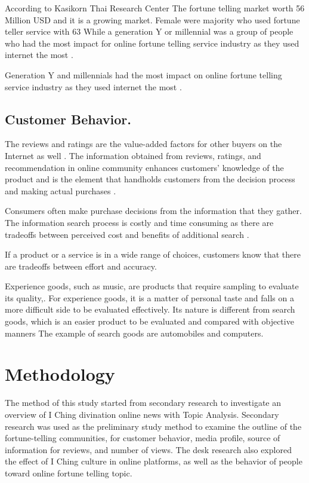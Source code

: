 \documentclass[conference]{IEEEtran}
\begin{document}
According to Kasikorn Thai Research Center \cite{10}The
fortune telling market worth 56 Million USD and it is a growing market. Female
were majority who used fortune teller service with 63%
\cite{11}While a generation Y or millennial was a group of people who
had the most impact for online fortune telling service industry as they used internet the most \cite{9}.

Generation Y and millennials had the most impact on online fortune telling service industry as they used internet the most \cite{9}.


\subsection{Customer Behavior.}
The reviews and ratings are the value-added factors for
other buyers on the Internet as well \cite{13}. The information obtained from
reviews, ratings, and recommendation in online community enhances customers’ knowledge of the product and is the element that handholds customers from the decision process and making actual purchases \cite{14}.

Consumers often make purchase decisions from the information that they
gather. The information search process is costly and time consuming as there are
tradeoffs between perceived cost and benefits of additional search \cite{15}.

If a product or a service is in a wide range of choices, customers know that there are tradeoffs between effort and accuracy\cite{16}.

Experience goods, such as music, are products that require sampling to
evaluate its quality,\cite{17}. For experience goods, it is a matter of personal
taste and falls on a more difficult side to be evaluated effectively. Its nature is
different from search goods, which is an easier product to be evaluated and compared
with objective manners \cite{18}The example of search goods are
automobiles and computers.

\section{Methodology}

The method of this study started from secondary research to investigate an
overview of I Ching divination online news with Topic Analysis. 
Secondary research was used as the preliminary study method to examine the
outline of the fortune-telling communities, for customer behavior, media profile, source of information for reviews, and number of views. The desk research also explored the effect of I Ching culture in online platforms, as well as the behavior of people toward online fortune telling topic.
\end{document}
